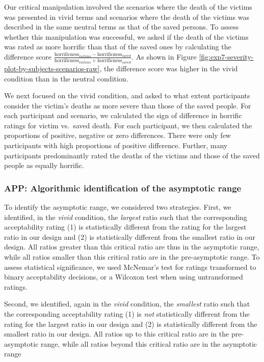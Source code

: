 \documentclass[
]{article}
\begin{document}
Our critical manipulation involved the scenarios where the death of the victims was presented in vivid terms and scenarios where the death of the victims was described in the same neutral terms as that of the saved persons. To assess whether this manipulation was successful, we asked if the death of the victims was rated as more horrific than that of the saved ones by calculating the difference score \(\frac{\text{horrificness}_{victims} - \text{horrificness}_{saved}}{\text{horrificness}_{victims} + \text{horrificness}_{saved}}\). As shown in Figure \ref{fig:exp7-severity-plot-by-subjects-scenarios-raw}, the difference score was higher in the vivid condition than in the neutral condition.

We next focused on the vivid condition, and asked to what extent participants consider the victim's deaths as more severe than those of the saved people. For each participant and scenario, we calculated the sign of difference in horrific ratings for victim vs.~saved death. For each participant, we then calculated the proportions of positive, negative or zero differences. There were only few participants with high proportions of positive difference. Further, many participants predominantly rated the deaths of the victims and those of the saved people as equally horrific.

\clearpage

\subsubsection{APP: Algorithmic identification of the asymptotic range}\label{app:find-asymptotes}

To identify the asymptotic range, we considered two strategies. First, we identified, in the \emph{vivid} condition, the \emph{largest} ratio such that the corresponding acceptability rating (1) is statistically different from the rating for the largest ratio in our design and (2) is statistically different from the smallest ratio in our design. All ratios greater than this critical ratio are thus in the asymptotic range, while all ratios smaller than this critical ratio are in the pre-asymptotic range. To assess statistical significance, we used McNemar's test for ratings transformed to binary acceptability decisions, or a Wilcoxon test when using untransformed ratings.

Second, we identified, again in the \emph{vivid} condition, the \emph{smallest} ratio such that the corresponding acceptability rating (1) is \emph{not} statistically different from the rating for the largest ratio in our design and (2) is statistically different from the smallest ratio in our design. All ratios up to this critical ratio are in the pre-asymptotic range, while all ratios beyond this critical ratio are in the asymptotic range
\end{document}
